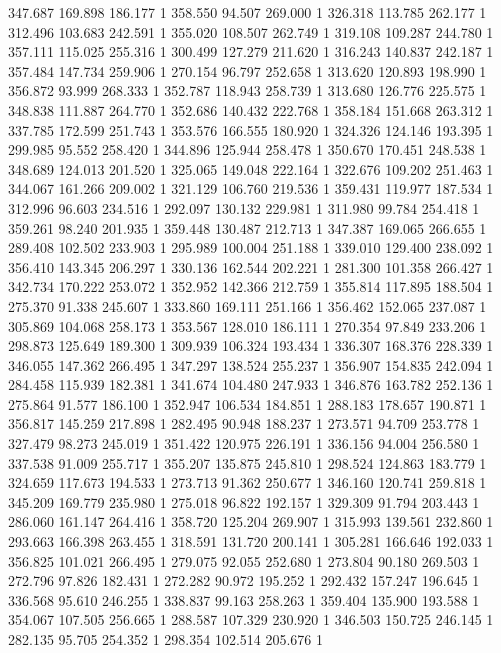 	347.687	169.898	186.177	1
	358.550	94.507	269.000	1
	326.318	113.785	262.177	1
	312.496	103.683	242.591	1
	355.020	108.507	262.749	1
	319.108	109.287	244.780	1
	357.111	115.025	255.316	1
	300.499	127.279	211.620	1
	316.243	140.837	242.187	1
	357.484	147.734	259.906	1
	270.154	96.797	252.658	1
	313.620	120.893	198.990	1
	356.872	93.999	268.333	1
	352.787	118.943	258.739	1
	313.680	126.776	225.575	1
	348.838	111.887	264.770	1
	352.686	140.432	222.768	1
	358.184	151.668	263.312	1
	337.785	172.599	251.743	1
	353.576	166.555	180.920	1
	324.326	124.146	193.395	1
	299.985	95.552	258.420	1
	344.896	125.944	258.478	1
	350.670	170.451	248.538	1
	348.689	124.013	201.520	1
	325.065	149.048	222.164	1
	322.676	109.202	251.463	1
	344.067	161.266	209.002	1
	321.129	106.760	219.536	1
	359.431	119.977	187.534	1
	312.996	96.603	234.516	1
	292.097	130.132	229.981	1
	311.980	99.784	254.418	1
	359.261	98.240	201.935	1
	359.448	130.487	212.713	1
	347.387	169.065	266.655	1
	289.408	102.502	233.903	1
	295.989	100.004	251.188	1
	339.010	129.400	238.092	1
	356.410	143.345	206.297	1
	330.136	162.544	202.221	1
	281.300	101.358	266.427	1
	342.734	170.222	253.072	1
	352.952	142.366	212.759	1
	355.814	117.895	188.504	1
	275.370	91.338	245.607	1
	333.860	169.111	251.166	1
	356.462	152.065	237.087	1
	305.869	104.068	258.173	1
	353.567	128.010	186.111	1
	270.354	97.849	233.206	1
	298.873	125.649	189.300	1
	309.939	106.324	193.434	1
	336.307	168.376	228.339	1
	346.055	147.362	266.495	1
	347.297	138.524	255.237	1
	356.907	154.835	242.094	1
	284.458	115.939	182.381	1
	341.674	104.480	247.933	1
	346.876	163.782	252.136	1
	275.864	91.577	186.100	1
	352.947	106.534	184.851	1
	288.183	178.657	190.871	1
	356.817	145.259	217.898	1
	282.495	90.948	188.237	1
	273.571	94.709	253.778	1
	327.479	98.273	245.019	1
	351.422	120.975	226.191	1
	336.156	94.004	256.580	1
	337.538	91.009	255.717	1
	355.207	135.875	245.810	1
	298.524	124.863	183.779	1
	324.659	117.673	194.533	1
	273.713	91.362	250.677	1
	346.160	120.741	259.818	1
	345.209	169.779	235.980	1
	275.018	96.822	192.157	1
	329.309	91.794	203.443	1
	286.060	161.147	264.416	1
	358.720	125.204	269.907	1
	315.993	139.561	232.860	1
	293.663	166.398	263.455	1
	318.591	131.720	200.141	1
	305.281	166.646	192.033	1
	356.825	101.021	266.495	1
	279.075	92.055	252.680	1
	273.804	90.180	269.503	1
	272.796	97.826	182.431	1
	272.282	90.972	195.252	1
	292.432	157.247	196.645	1
	336.568	95.610	246.255	1
	338.837	99.163	258.263	1
	359.404	135.900	193.588	1
	354.067	107.505	256.665	1
	288.587	107.329	230.920	1
	346.503	150.725	246.145	1
	282.135	95.705	254.352	1
	298.354	102.514	205.676	1

